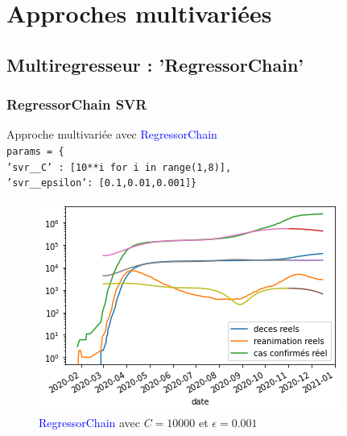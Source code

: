 \documentclass{beamer}[aspectratio = 43]
\begin{document}
\section{Approches multivariées}
\subsection*{Multiregresseur : 'RegressorChain'}
\begin{frame}
	\frametitle{RegressorChain SVR}
	Approche multivariée avec \textcolor{blue}{RegressorChain}\\
	\texttt{params = \{\\'svr\_\_C' : [10**i for i in range(1,8)],\\ 
	'svr\_\_epsilon': [0.1,0.01,0.001]\}}\\
	\begin{figure}[h]
		\includegraphics[scale=0.5]{mr_c10000_eps0001}
		\caption{ \textcolor{blue}{RegressorChain} avec $C = 10000$ et $\epsilon = 0.001$}
	\end{figure}
\end{frame}
\end{document}
